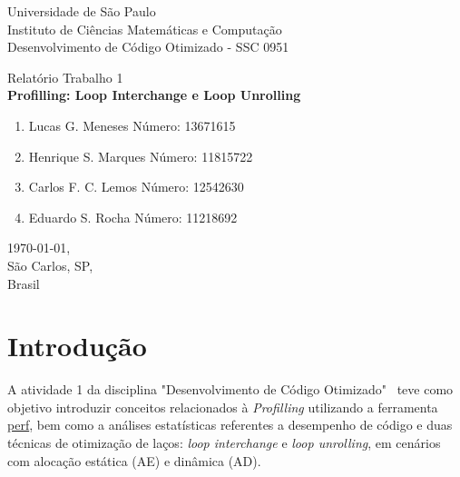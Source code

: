 \documentclass[12pt,a4paper]{article}
\begin{document}

\thispagestyle{empty}
\begin{minipage}{\textwidth}\centering
Universidade de São Paulo \\
Instituto de Ciências Matemáticas e Computação \\
Desenvolvimento de Código Otimizado - SSC 0951 \\
\end{minipage}

\vspace{5cm}

\begin{minipage}{\textwidth}\centering
\Large Relatório Trabalho 1  \\
\vspace{2cm}
\Large \textbf{Profilling: Loop Interchange e Loop Unrolling}
\end{minipage}

\vspace{3cm}

\begin{minipage}{\linewidth}\centering
\begin{enumerate}
     \item Lucas G. Meneses   \space \space \space \space \space \space  Número: 13671615
      \item Henrique S. Marques  \space \space Número: 11815722
      \item Carlos F. C. Lemos  \space \space \space \space Número: 12542630
      \item Eduardo S. Rocha  \space \space \space \space \space \space Número: 11218692
\end{enumerate}
\end{minipage}

\vfill

\begin{minipage}{\linewidth}
\centering\today, \\
São Carlos, SP, \\
Brasil
\end{minipage}

\clearpage
\thispagestyle{empty}

\tableofcontents

\section{Introdução}

A atividade 1 da disciplina "Desenvolvimento de Código Otimizado"{~} teve como objetivo introduzir conceitos relacionados à \textit{Profilling} utilizando a ferramenta \href{https://perf.wiki.kernel.org}{perf}, bem como a análises estatísticas referentes a desempenho de código e duas técnicas de otimização de laços: \textit{loop interchange} e \textit{loop unrolling}, em cenários com alocação estática (AE) e dinâmica (AD).
\end{document}
